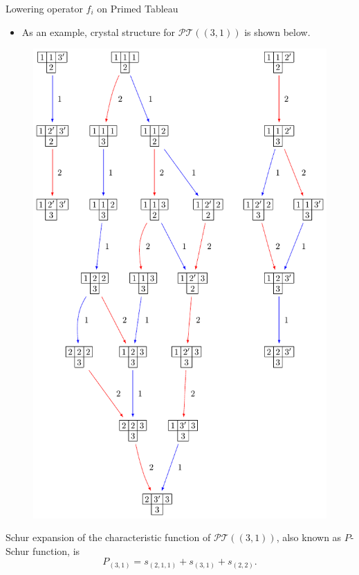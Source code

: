 \documentclass[final]{beamer}
\theoremstyle{definition}
\numberwithin{equation}{section}
\newlength{\onecolwid}
\begin{document}
\begin{frame}[t]
\begin{columns}[t]
\begin{column}{\onecolwid}
\begin{block}{Lowering operator $f_i$ on Primed Tableau}
\begin{itemize}
\item As an example, crystal structure for $\mathcal{PT} ((3,1))$ is shown below.
\end{itemize}


\begin{figure}
\includegraphics[scale=1.55]{Crystal_Shifted}
\centering
\end{figure}

 Schur expansion of the characteristic function of $\mathcal{PT} ((3,1))$, also known as $P$-Schur function, is
 \begin{equation*}
 P_{(3,1)} = s_{(2,1,1)} + s_{(3,1)} + s_{(2,2)}.
 \end{equation*}
 

\end{block}
\end{column}
\end{columns}
\end{frame}
\end{document}

